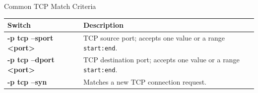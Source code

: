 \begin{frame}{Common TCP Match Criteria}
\centering\fontsize{12}{14}\selectfont
\renewcommand{\arraystretch}{1.35}
\begin{tabular}{|Y{4.8cm}|Y{7.7cm}|}\hline
{}\color{white}\bfseries Switch&\color{white}\bfseries Description\\\hline
\textcolor{CommandGreen}{\ttfamily\bfseries -p tcp --sport <port>}&TCP source port; accepts one value or a range \texttt{start:end}.\\\hline
\textcolor{CommandGreen}{\ttfamily\bfseries -p tcp --dport <port>}&TCP destination port; accepts one value or a range \texttt{start:end}.\\\hline
\textcolor{CommandGreen}{\ttfamily\bfseries -p tcp --syn}&Matches a new TCP connection request.\\\hline
\end{tabular}
\end{frame}
